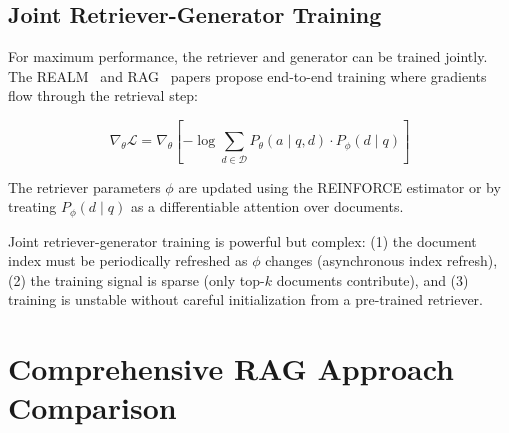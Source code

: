 \subsection{Joint Retriever-Generator Training}
\label{joint-retriever-generator-training}

For maximum performance, the retriever and generator can be trained jointly. The REALM~\cite{guu2020realm} and RAG~\cite{lewis2020retrieval} papers propose end-to-end training where gradients flow through the retrieval step:

\begin{equation}
  \nabla_\theta \mathcal{L} = \nabla_\theta \left[
    -\log \sum_{d \in \mathcal{D}} P_\theta(a \mid q, d) \cdot P_\phi(d \mid q)
  \right]
\end{equation}

The retriever parameters $\phi$ are updated using the REINFORCE estimator or by treating $P_\phi(d \mid q)$ as a differentiable attention over documents.

\begin{warningbox}
Joint retriever-generator training is powerful but complex: (1) the document index must be periodically refreshed as $\phi$ changes (asynchronous index refresh), (2) the training signal is sparse (only top-$k$ documents contribute), and (3) training is unstable without careful initialization from a pre-trained retriever.
\end{warningbox}

\section{Comprehensive RAG Approach Comparison}
\label{comprehensive-rag-approach-comparison}

